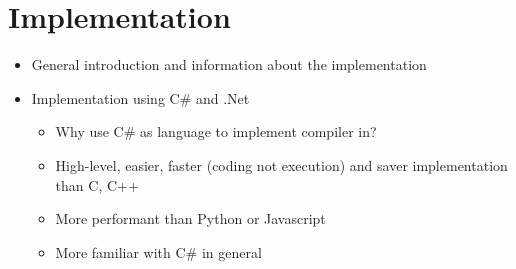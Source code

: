 \chapter{Implementation}
\label{ch:implementation}
\begin{itemize}
    \item General introduction and information about the implementation
    \item Implementation using C\# and .Net
    \begin{itemize}
        \item Why use C\# as language to implement compiler in?
        \item High-level, easier, faster (coding not execution) and saver implementation than C, C++
        \item More performant than Python or Javascript
        \item More familiar with C\# in general
    \end{itemize}
\end{itemize}









